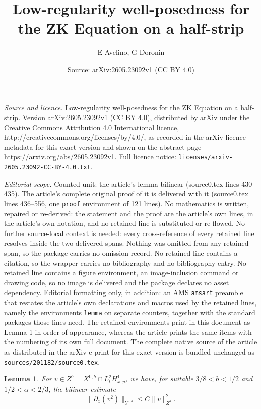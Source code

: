 \documentclass[10pt,a4paper]{amsart}
\title{Low-regularity well-posedness for the ZK Equation on a half-strip}
\author{E Avelino, G Doronin}
\date{Source: arXiv:2605.23092v1 (CC BY 4.0)}
\newtheorem{lemma}{Lemma}
\begin{document}
\maketitle

\noindent\emph{Source and licence.} Low-regularity well-posedness for the ZK Equation on a half-strip. Version arXiv:2605.23092v1 (CC BY 4.0), distributed by arXiv under the Creative Commons Attribution 4.0 International licence, http://creativecommons.org/licenses/by/4.0/, as recorded in the arXiv licence metadata for this exact version and shown on the abstract page https://arxiv.org/abs/2605.23092v1. Full licence notice: \texttt{licenses/arxiv-2605.23092-CC-BY-4.0.txt}.\par\smallskip

\noindent\textit{Editorial scope.} Counted unit: the article's lemma bilinear (source0.tex lines 430--435). The article's complete original proof of it is delivered with it (source0.tex lines 436--556, one \texttt{proof} environment of 121 lines). No mathematics is written, repaired or re-derived: the statement and the proof are the article's own lines, in the article's own notation, and no retained line is substituted or re-flowed.  No further source-local context is needed: every cross-reference of every retained line resolves inside the two delivered spans.  Nothing was omitted from any retained span, so the package carries no omission record.  No retained line contains a citation, so the wrapper carries no bibliography and no bibliography entry.  No retained line contains a figure environment, an image-inclusion command or drawing code, so no image is delivered and the package declares no asset dependency.  Editorial formatting only, in addition: an AMS \texttt{amsart} preamble that restates the article's own declarations and macros used by the retained lines, namely the environments \texttt{lemma} on separate counters, together with the standard packages those lines need.  The retained environments print in this document as Lemma 1 in order of appearance, whereas the article prints the same items with the numbering of its own full document.  The complete native source of the article as distributed in the arXiv e-print for this exact version is bundled unchanged as \texttt{sources/201182/source0.tex}.
\begin{lemma}
For $v \in Z^{b} = X^{0,b} \cap L^{2}_{t} H^{1}_{x,y}$, we have, for suitable $3/8<b<1/2$ and $1/2<\alpha<2/3$, the bilinear estimate
\begin{equation}\label{bilinear}
\|\partial_{x}(v^{2})\|_{Y^{0,b}}\leq C\|v\|_{Z^{b}}^{2}.
\end{equation}
\end{lemma}
\end{document}
